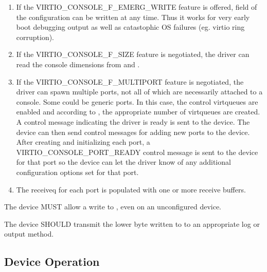 \begin{enumerate}
\item If the VIRTIO_CONSOLE_F_EMERG_WRITE feature is offered,
   field of the configuration can be written at any time.
  Thus it works for very early boot debugging output as well as
  catastophic OS failures (eg. virtio ring corruption).

\item If the VIRTIO_CONSOLE_F_SIZE feature is negotiated, the driver
  can read the console dimensions from  and .

\item If the VIRTIO_CONSOLE_F_MULTIPORT feature is negotiated, the
  driver can spawn multiple ports, not all of which are necessarily
  attached to a console. Some could be generic ports. In this
  case, the control virtqueues are enabled and according to
  , the appropriate number
  of virtqueues are created. A control message indicating the
  driver is ready is sent to the device. The device can then send
  control messages for adding new ports to the device. After
  creating and initializing each port, a
  VIRTIO_CONSOLE_PORT_READY control message is sent to the device
  for that port so the device can let the driver know of any additional
  configuration options set for that port.

\item The receiveq for each port is populated with one or more
  receive buffers.
\end{enumerate}


The device MUST allow a write to , even on an
unconfigured device.

The device SHOULD transmit the lower byte written to  to
an appropriate log or output method.

\subsection{Device Operation}\label{sec:Device Types / Console Device / Device Operation}

